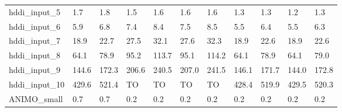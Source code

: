 \begin{table}
\begin{adjustbox}{max totalheight=\textheight}
\begin{tabular}{|l|llllllllll|}
    hddi\_input\_5     & 1.7      & 1.8      & 1.5      & 1.6      & 1.6      & 1.6      & 1.3      & 1.3      & 1.2      & 1.3      \\
    hddi\_input\_6     & 5.9      & 6.8      & 7.4      & 8.4      & 7.5      & 8.5      & 5.5      & 6.4      & 5.5      & 6.3      \\
    hddi\_input\_7     & 18.9     & 22.7     & 27.5     & 32.1     & 27.6     & 32.3     & 18.9     & 22.6     & 18.9     & 22.6     \\
    hddi\_input\_8     & 64.1     & 78.9     & 95.2     & 113.7    & 95.1     & 114.2    & 64.1     & 78.9     & 64.1     & 79.0     \\
    hddi\_input\_9     & 144.6    & 172.3    & 206.6    & 240.5    & 207.0    & 241.5    & 146.1    & 171.7    & 144.0    & 172.8    \\
    hddi\_input\_10    & 429.6    & 521.4    & TO       & TO       & TO       & TO       & 428.4    & 519.9    & 429.5    & 520.3    \\ \hline
    ANIMO\_small       & 0.7      & 0.7      & 0.2      & 0.2      & 0.2      & 0.2      & 0.2      & 0.2      & 0.2      & 0.2      \\ \hline
    \end{tabular}
\end{adjustbox}
\end{table}

